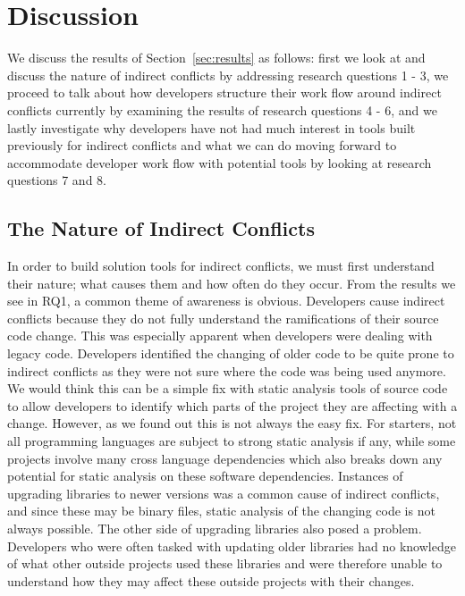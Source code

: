 \documentclass[conference]{IEEEtran}
\begin{document}
\section{Discussion}
\label{sec:disc}

We discuss the results of Section~\ref{sec:results} as follows: first we look at and discuss the nature of indirect conflicts by addressing
research questions 1 - 3, we proceed to talk about how developers structure their work flow around indirect conflicts currently by
examining the results of research questions 4 - 6, and we lastly investigate why developers have not had much interest in tools built previously
for indirect conflicts and what we can do moving forward to accommodate developer work flow with potential tools by looking at
research questions 7 and 8.

\subsection{The Nature of Indirect Conflicts}

In order to build solution tools for indirect conflicts, we must first understand their nature; what causes them and how often do they 
occur. From the results we see in RQ1, a common theme of awareness is obvious. Developers cause indirect conflicts because they do not
fully understand the ramifications of their source code change. This was especially apparent when developers were dealing with legacy code.
Developers identified the changing of older code to be quite prone to indirect conflicts as they were not sure where the code was being used
anymore. We would think this can be a simple fix with static analysis tools of source
code to allow developers to identify which parts of the project they are affecting with a change. However, as we found out this is not always
the easy fix. For starters, not all programming languages are subject to strong static analysis if any, while some projects involve many
cross language dependencies which also breaks down any potential for static analysis on these software dependencies. 
Instances of upgrading libraries to newer versions was a common cause of indirect conflicts, and since these may be binary files,
static analysis of the changing code is not always possible. The other side of upgrading libraries also posed a problem. Developers who were often
tasked with updating older libraries had no knowledge of what other outside projects used these libraries and were therefore unable to understand
how they may affect these outside projects with their changes.
\end{document}
